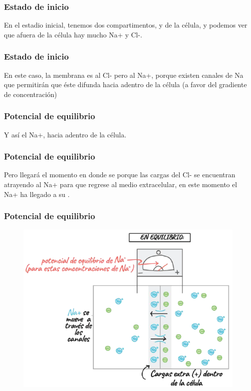 \documentclass[14pt]{beamer}
\begin{document}
\begin{frame}
\frametitle{Estado de inicio}
En el estadio inicial, tenemos dos compartimentos,  y  de la célula, \pause y podemos ver que afuera de la célula hay mucho Na+ y Cl-.
\end{frame}
\begin{frame}
\frametitle{Estado de inicio}
En este caso, la membrana es  al Cl- \pause pero  al Na+, \pause porque existen canales de Na que permitirán que éste difunda hacia adentro de la célula (a favor del gradiente de concentración)
\end{frame}
\begin{frame}
\frametitle{Potencial de equilibrio}
Y así el Na+,   hacia adentro de la célula.
\end{frame}
\begin{frame}
\frametitle{Potencial de equilibrio}
Pero llegará el momento en donde se  \pause porque las cargas del Cl- se encuentran atrayendo al Na+ para que regrese al medio extracelular, \pause en este momento el Na+ ha llegado a su .
\end{frame}
\begin{frame}
\frametitle{Potencial de equilibrio}
\vspace*{-0.75cm}
\begin{figure}
    \centering
    \includegraphics[scale=0.6]{Imagenes/Potencial_Accion_05.png}
\end{figure}
\end{frame}
\end{document}
